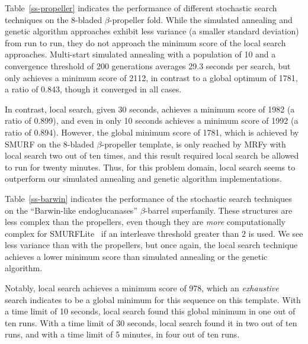 \documentclass{acm_proc_article-sp}
\begin{document}
Table~\ref{ss-propeller} indicates the performance of different stochastic
search techniques on the 8-bladed $\beta$-propeller fold.
While the simulated annealing and genetic algorithm approaches exhibit less
variance (a smaller standard deviation) from run to run, they do not approach
the minimum score of the local search approaches. Multi-start simulated 
annealing with a population of 10 and a convergence threshold of 200 generations
averages 29.3 seconds per search, but only achieves a minimum score of 2112, 
in contrast to a global optimum of 1781, a ratio of 0.843, though it converged 
in all cases.

In contrast, local search, given 30 seconds, achieves a minimum score of 1982 (a ratio of 0.899), 
and even in only 10 seconds achieves a minimum score of 1992 (a ratio of 0.894).
However, the global minimum score of 1781, which is achieved by SMURF on the
8-bladed $\beta$-propeller template, is only reached by MRFy with local search
two out of ten times, and this result required local search be allowed to run
for twenty minutes.
Thus, for this problem domain, local search seems to outperform our simulated
annealing and genetic algorithm implementations.


Table~\ref{ss-barwin} indicates the performance of the stochastic
search techniques on the ``Barwin-like endoglucanases'' $\beta$-barrel 
superfamily.
These structures are less complex than the propellers, even though they are
\emph{more} computationally complex for SMURFLite~\cite{Daniels:2012dg} if an 
interleave threshold greater than 2 is used. 
We see less variance than with the propellers, but once again, the local search
technique achieves a lower minimum score than simulated annealing or the genetic
algorithm.

Notably, local search achieves a minimum score of 978, which an 
\emph{exhaustive} search indicates to be a global minimum for this sequence on
this template.
With a time limit of 10 seconds, local search found this global minimum in one 
out of ten runs. 
With a time limit of 30 seconds, local search found it in two out of
ten runs, and with a time limit of 5 minutes, in four out of ten runs.

\end{document}
